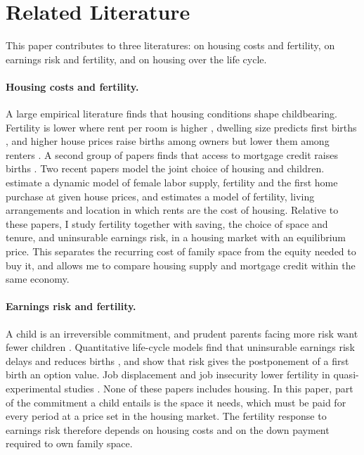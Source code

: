 \section{Related Literature}
\label{sec:intro}

This paper contributes to three literatures: on housing costs and fertility,
on earnings risk and fertility, and on housing over the life cycle.

\paragraph{Housing costs and fertility.}
A large empirical literature finds that housing conditions shape
childbearing. Fertility is lower where rent per room is higher
\citep{simonTamuraHigherRents2009}, dwelling size predicts first births
\citep{stromHousingFirstBirths2010}, and higher house prices raise births
among owners but lower them among renters
\citep{dettlingHousePricesBirth2014,lovenheimFamilyWealthShocks2013}. A
second group of papers finds that access to mortgage credit raises births
\citep{hacamoBabiesMortgageDeregulation2021,cummingMonetaryPolicyBirth2024,dettlingKearneyModernMortgage2025,vandoornikFazioRamadoraiSkrastinsHousingFertility2025}.
Two recent papers model the joint choice of housing and children.
\citet{khorunzhinaMillerAmericanDream2022} estimate a dynamic model of
female labor supply, fertility and the first home purchase at given house
prices, and \citet{couillardBuildBabyBuild2025} estimates a model of
fertility, living arrangements and location in which rents are the cost of
housing. Relative to these papers, I study fertility together with saving,
the choice of space and tenure, and uninsurable earnings risk, in a housing
market with an equilibrium price. This separates the recurring cost of
family space from the equity needed to buy it, and allows me to compare
housing supply and mortgage credit within the same economy.

\paragraph{Earnings risk and fertility.}
A child is an irreversible commitment, and prudent parents facing more risk
want fewer children \citep{fraserIncomeRisk2001}. Quantitative life-cycle
models find that uninsurable earnings risk delays and reduces births
\citep{sommerFertilityChoiceLife2016,ejrnaesJorgensenFamilyPlanning2020,nakakuniFertilityIncomeUncertainty2026},
and \citet{deLaCroixPommeretChildbearing2021} show that risk gives the
postponement of a first birth an option value. Job displacement and job
insecurity lower fertility in quasi-experimental studies
\citep{delBonoWeberWinterEbmer2012,clarkLepinteurJobInsecurity2022}. None
of these papers includes housing. In this paper, part of the commitment a
child entails is the space it needs, which must be paid for every period at
a price set in the housing market. The fertility response to earnings risk
therefore depends on housing costs and on the down payment required to own
family space.

